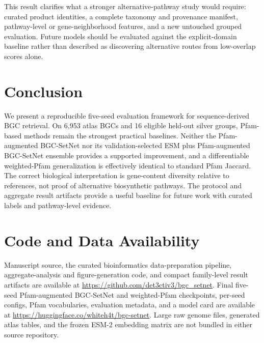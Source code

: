 \documentclass{article}
\begin{document}
This result clarifies what a stronger alternative-pathway study would require: curated product identities, a complete taxonomy and provenance manifest, pathway-level or gene-neighborhood features, and a new untouched grouped evaluation. Future models should be evaluated against the explicit-domain baseline rather than described as discovering alternative routes from low-overlap scores alone.

\section{Conclusion}

We present a reproducible five-seed evaluation framework for sequence-derived BGC retrieval. On 6,953 atlas BGCs and 16 eligible held-out silver groups, Pfam-based methods remain the strongest practical baselines. Neither the Pfam-augmented BGC-SetNet nor its validation-selected ESM plus Pfam-augmented BGC-SetNet ensemble provides a supported improvement, and a differentiable weighted-Pfam generalization is effectively identical to standard Pfam Jaccard. The correct biological interpretation is gene-content diversity relative to references, not proof of alternative biosynthetic pathways. The protocol and aggregate result artifacts provide a useful baseline for future work with curated labels and pathway-level evidence.

\section*{Code and Data Availability}
Manuscript source, the curated bioinformatics data-preparation pipeline, aggregate-analysis and figure-generation code, and compact family-level result artifacts are available at \url{https://github.com/det3ctiv3/bgc_setnet}. Final five-seed Pfam-augmented BGC-SetNet and weighted-Pfam checkpoints, per-seed configs, Pfam vocabularies, evaluation metadata, and a model card are available at \url{https://huggingface.co/whiteh4t/bgc-setnet}. Large raw genome files, generated atlas tables, and the frozen ESM-2 embedding matrix are not bundled in either source repository.
\end{document}

